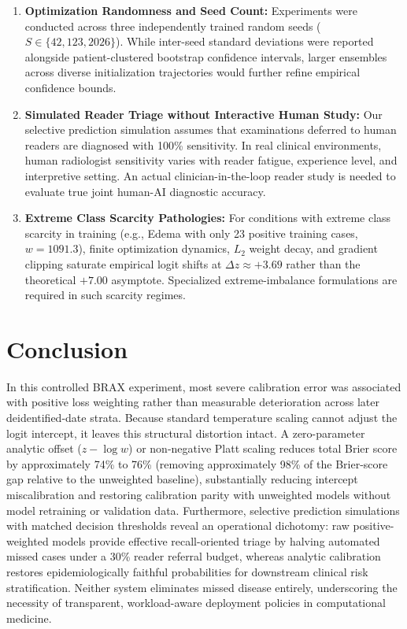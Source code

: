\documentclass[preprint,12pt]{elsarticle}
\begin{document}
\begin{enumerate}
    \item \textbf{Optimization Randomness and Seed Count:} Experiments were conducted across three independently trained random seeds ($S \in \{42, 123, 2026\}$). While inter-seed standard deviations were reported alongside patient-clustered bootstrap confidence intervals, larger ensembles across diverse initialization trajectories would further refine empirical confidence bounds.
    \item \textbf{Simulated Reader Triage without Interactive Human Study:} Our selective prediction simulation assumes that examinations deferred to human readers are diagnosed with 100\% sensitivity. In real clinical environments, human radiologist sensitivity varies with reader fatigue, experience level, and interpretive setting. An actual clinician-in-the-loop reader study is needed to evaluate true joint human-AI diagnostic accuracy.
    \item \textbf{Extreme Class Scarcity Pathologies:} For conditions with extreme class scarcity in training (e.g., Edema with only 23 positive training cases, $w = 1091.3$), finite optimization dynamics, $L_2$ weight decay, and gradient clipping saturate empirical logit shifts at $\Delta z \approx +3.69$ rather than the theoretical $+7.00$ asymptote. Specialized extreme-imbalance formulations are required in such scarcity regimes.
\end{enumerate}

\section{Conclusion}
In this controlled BRAX experiment, most severe calibration error was associated with positive loss weighting rather than measurable deterioration across later deidentified-date strata. Because standard temperature scaling cannot adjust the logit intercept, it leaves this structural distortion intact. A zero-parameter analytic offset ($z - \log w$) or non-negative Platt scaling reduces total Brier score by approximately 74\% to 76\% (removing approximately 98\% of the Brier-score gap relative to the unweighted baseline), substantially reducing intercept miscalibration and restoring calibration parity with unweighted models without model retraining or validation data. Furthermore, selective prediction simulations with matched decision thresholds reveal an operational dichotomy: raw positive-weighted models provide effective recall-oriented triage by halving automated missed cases under a 30\% reader referral budget, whereas analytic calibration restores epidemiologically faithful probabilities for downstream clinical risk stratification. Neither system eliminates missed disease entirely, underscoring the necessity of transparent, workload-aware deployment policies in computational medicine.
\end{document}

